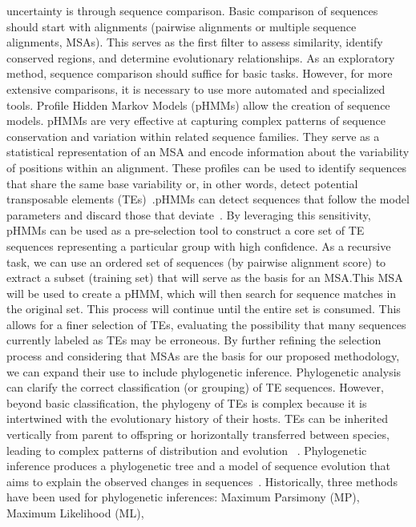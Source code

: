 \documentclass[unnumsec,webpdf,contemporary,large]{oup-authoring-template}%
\theoremstyle{thmstyleone}%
\theoremstyle{thmstyletwo}%
\theoremstyle{thmstylethree}%
\begin{document}
uncertainty is through sequence comparison. Basic comparison of sequences should
start with alignments (pairwise alignments or multiple sequence alignments,
MSAs). This serves as the first filter to assess similarity, identify conserved
regions, and determine evolutionary relationships. As an exploratory method,
sequence comparison should suffice for basic tasks. However, for more extensive
comparisons, it is necessary to use more automated and specialized tools.
Profile Hidden Markov Models (pHMMs) allow the creation of sequence models.
pHMMs are very effective at capturing complex patterns of sequence conservation
and variation within related sequence families. They serve as a statistical
representation of an MSA and encode information about the variability of
positions within an alignment. These profiles can be used to identify sequences
that share the same base variability or, in other words, detect potential
transposable elements (TEs)~\cite{storer_dfam_2021, eddy_profile_1998}.\@ pHMMs
can detect sequences that follow the model parameters and discard those that
deviate~\cite{wheeler_dfam_2012}. By leveraging this sensitivity, pHMMs can be
used as a pre-selection tool to construct a core set of TE sequences
representing a particular group with high confidence. As a recursive task, we
can use an ordered set of sequences (by pairwise alignment score) to extract a
subset (training set) that will serve as the basis for an MSA.\@ This MSA will
be used to create a pHMM, which will then search for sequence matches in the
original set. This process will continue until the entire set is consumed. This
allows for a finer selection of TEs, evaluating the possibility that many
sequences currently labeled as TEs may be erroneous. By further refining the
selection process and considering that MSAs are the basis for our proposed
methodology, we can expand their use to include phylogenetic inference.
Phylogenetic analysis can clarify the correct classification (or grouping) of TE
sequences. However, beyond basic classification, the phylogeny of TEs is complex
because it is intertwined with the evolutionary history of their hosts. TEs can
be inherited vertically from parent to offspring or horizontally transferred
between species, leading to complex patterns of distribution and evolution
~\cite{wells_field_2020}. Phylogenetic inference produces a phylogenetic tree
and a model of sequence evolution that aims to explain the observed changes in
sequences~\cite{yang_molecular_2014}. Historically, three methods have been used
for phylogenetic inferences: Maximum Parsimony (MP), Maximum Likelihood (ML),
\end{document}
